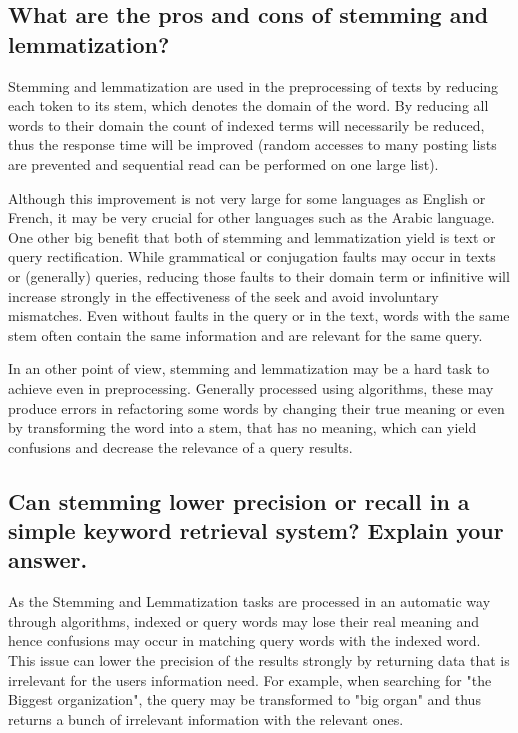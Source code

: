 \documentclass{scrartcl}
\begin{document}
\subsection{What are the pros and cons of stemming and lemmatization?}

Stemming and lemmatization are used in the preprocessing of texts by reducing each token to its stem, which denotes the domain of the word. By reducing all words to their domain the count of indexed terms will necessarily be reduced, thus the response time will be improved (random accesses to many posting lists are prevented and sequential read can be performed on one large list).

Although this improvement is not very large for some languages as English or French, it may be very crucial for other languages such as the Arabic language. One other big benefit that both of stemming and lemmatization yield is text or query rectification. While grammatical or conjugation faults may occur in texts or (generally) queries, reducing those faults to their domain term or infinitive will increase strongly in the effectiveness of the seek and avoid involuntary mismatches. Even without faults in the query or in the text, words with the same stem often contain the same information and are relevant for the same query.

In an other point of view, stemming and lemmatization may be a hard task to achieve even in preprocessing. Generally processed using algorithms, these may produce errors in refactoring some words by changing their true meaning or even by transforming the word into a stem, that has no meaning, which can yield confusions and decrease the relevance of a query results.

\subsection{Can stemming lower precision or recall in a simple keyword retrieval system? Explain your answer.}

As the Stemming and Lemmatization tasks are processed in an automatic way through algorithms, indexed or query words may lose their real meaning and hence confusions may occur in matching query words with the indexed word. This issue can lower the precision of the results strongly by returning data that is irrelevant for the users information need. For example, when searching for "the Biggest organization", the query may be transformed to "big organ" and thus returns a bunch of irrelevant information with the relevant ones.
\end{document}
